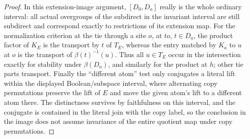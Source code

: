 \begin{proof}
In this extension-image argument, \([D_0,D_a]\) really is the whole ordinary interval: all actual
overgroups of the subdirect in the invariant interval are still subdirect and correspond exactly
to restrictions of its extension map. For the normalization criterion at the tie through a site
\(o\), at \(t o\), \(t\in D_a\), the product factor of \(K_E\) is the transport by \(t\) of
\(T_E\), whereas the entry matched by \(K_a\) to \(u\) at \(o\) is the transport of
\(\beta(t)^{-1}(u)\). Thus all \(u\in T_E\) occur in the intersection exactly for stability under
\(\beta(D_a)\), and similarly for the product at \(h\); other tie parts transport. Finally the
``different atom'' test only conjugates a literal lift within the displayed Boolean/subspace
interval, where alternating copy permutations preserve the lift of \(E\) and move the given atom's
lift to a different atom there. The distinctness survives by faithfulness on this interval, and
the conjugate is contained in the literal join with the copy label, so the conclusion in the image
does not assume invariance of the entire quotient map under copy permutations.
\end{proof}


